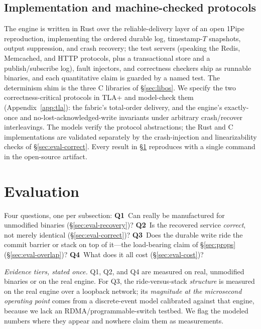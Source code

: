 \subsection{Implementation and machine-checked protocols}
\label{sec:impl}

The engine is written in Rust over the reliable-delivery layer
of an open 1Pipe reproduction, implementing the ordered durable log,
timestamp-$T$ snapshots, output suppression, and crash recovery; the test
servers (speaking the Redis, Memcached, and HTTP protocols, plus a
transactional store and a publish/subscribe log), fault injectors, and
correctness checkers ship as
runnable binaries, and each quantitative claim is guarded by a named test.
The determinism shim is the three C libraries of \S\ref{sec:libos}. We
specify the two correctness-critical protocols in TLA+ and model-check
them (Appendix~\ref{app:tla}): the fabric's total-order delivery, and the
engine's exactly-once and no-lost-acknowledged-write invariants under
arbitrary crash/recover interleavings. The models verify the protocol
abstractions; the Rust and C implementations are validated separately by
the crash-injection and linearizability checks of \S\ref{sec:eval-correct}.
Every result in \S\ref{sec:eval} reproduces with a single command in the
open-source artifact.

\section{Evaluation}
\label{sec:eval}

Four questions, one per subsection:
\textbf{Q1}~Can \Determinism really be manufactured for unmodified
binaries (\S\ref{sec:eval-recovery})?
\textbf{Q2}~Is the recovered service \emph{correct}, not merely identical
(\S\ref{sec:eval-correct})?
\textbf{Q3}~Does the durable write ride the commit barrier or stack on top
of it---the load-bearing claim of \S\ref{sec:props}
(\S\ref{sec:eval-overlap})?
\textbf{Q4}~What does it all cost (\S\ref{sec:eval-cost})?

\emph{Evidence tiers, stated once.} Q1, Q2, and Q4 are measured on real,
unmodified binaries or on the real engine. For Q3, the ride-versus-stack
\emph{structure} is measured on the real engine over a loopback network;
its \emph{magnitude at the microsecond operating point} comes from a
discrete-event model calibrated against that engine, because we lack an
RDMA/programmable-switch testbed. We flag the modeled numbers where they
appear and nowhere claim them as measurements.


